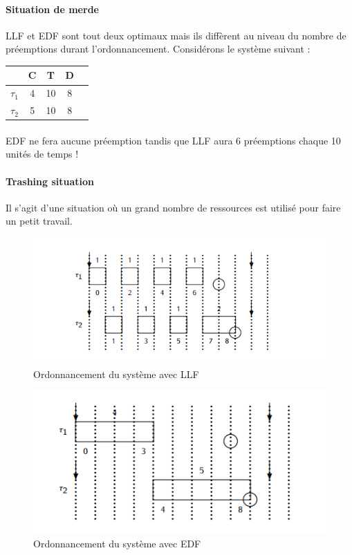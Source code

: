 \paragraph{Situation de merde} LLF et EDF sont tout deux optimaux mais ils diffèrent au niveau du nombre de préemptions durant l'ordonnancement. Considérons le système suivant :
  \begin{center}
    \begin{tabular}{| l | c | c | c | c |}
      \hline
                    &  C  & T  & D  \\
      \hline
       $\tau_{1}$   &  4  & 10 & 8  \\
      \hline
       $\tau_{2}$   &  5  & 10 & 8  \\
      \hline
  \end{tabular}
  \end{center}
\paragraph{} EDF ne fera aucune préemption tandis que LLF aura 6 préemptions chaque 10 unités de temps !

\paragraph{Trashing situation} Il s'agit d'une situation où un grand nombre de ressources est utilisé pour faire un petit travail.

\begin{figure}[H]
\centering
\includegraphics[width=\textwidth]{img_2_18__0}
\caption{Ordonnancement du système avec LLF}
\end{figure}

\begin{figure}[H]
\centering
\includegraphics[width=\textwidth]{img_2_18__1}
\caption{Ordonnancement du système avec EDF}
\end{figure}


